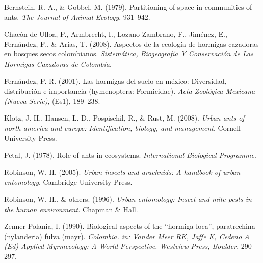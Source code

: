 \documentclass[11pt,]{article}
\begin{document}
\hypertarget{ref-bernstein1979partitioning}{}
Bernstein, R. A., \& Gobbel, M. (1979). Partitioning of space in
communities of ants. \emph{The Journal of Animal Ecology}, 931--942.

\hypertarget{ref-chacon2008aspectos}{}
Chacón de Ulloa, P., Armbrecht, I., Lozano-Zambrano, F., Jiménez, E.,
Fernández, F., \& Arias, T. (2008). Aspectos de la ecología de hormigas
cazadoras en bosques secos colombianos. \emph{Sistemática, Biogeografía
Y Conservación de Las Hormigas Cazadoras de Colombia}.

\hypertarget{ref-fernandez2001hormigas}{}
Fernández, P. R. (2001). Las hormigas del suelo en méxico: Diversidad,
distribución e importancia (hymenoptera: Formicidae). \emph{Acta
Zoológica Mexicana (Nueva Serie)}, (Es1), 189--238.

\hypertarget{ref-klotz2008urban}{}
Klotz, J. H., Hansen, L. D., Pospischil, R., \& Rust, M. (2008).
\emph{Urban ants of north america and europe: Identification, biology,
and management}. Cornell University Press.

\hypertarget{ref-petal1978role}{}
Petal, J. (1978). Role of ants in ecosystems. \emph{International
Biological Programme}.

\hypertarget{ref-robinson2005urban}{}
Robinson, W. H. (2005). \emph{Urban insects and arachnids: A handbook of
urban entomology}. Cambridge University Press.

\hypertarget{ref-robinson1996urban}{}
Robinson, W. H., \& others. (1996). \emph{Urban entomology: Insect and
mite pests in the human environment.} Chapman \& Hall.

\hypertarget{ref-zenner1990biological}{}
Zenner-Polania, I. (1990). Biological aspects of the ``hormiga loca'',
paratrechina (nylanderia) fulva (mayr). \emph{Colombia. in: Vander Meer
RK, Jaffe K, Cedeno A (Ed) Applied Myrmecology: A World Perspective.
Westview Press, Boulder}, 290--297.




\newpage
\singlespacing 
\end{document}
